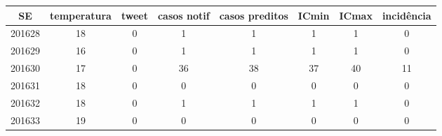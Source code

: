 \begin{tabular}{c|ccccccc}
  \hline
SE & temperatura & tweet & casos notif & casos preditos & ICmin & ICmax & incidência \\ 
  \hline
201628 & 18 & 0 & 1 & 1 & 1 & 1 & 0 \\ 
  201629 & 16 & 0 & 1 & 1 & 1 & 1 & 0 \\ 
  201630 & 17 & 0 & 36 & 38 & 37 & 40 & 11 \\ 
  201631 & 18 & 0 & 0 & 0 & 0 & 0 & 0 \\ 
  201632 & 18 & 0 & 1 & 1 & 1 & 1 & 0 \\ 
  201633 & 19 & 0 & 0 & 0 & 0 & 0 & 0 \\ 
   \hline
\end{tabular}
